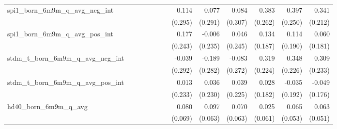 \begin{tabular}{lrrrrrrrrrrrr}
spi1\_born\_6m9m\_q\_avg\_neg\_int          &              &              &              &              &              &              &        0.114 &        0.077 &        0.084 &        0.383 &        0.397 &        0.341 \\ 
                                            &              &              &              &              &              &              &      (0.295) &      (0.291) &      (0.307) &      (0.262) &      (0.250) &      (0.212) \\ 
spi1\_born\_6m9m\_q\_avg\_pos\_int          &              &              &              &              &              &              &        0.177 &       -0.006 &        0.046 &        0.134 &        0.114 &        0.060 \\ 
                                            &              &              &              &              &              &              &      (0.243) &      (0.235) &      (0.245) &      (0.187) &      (0.190) &      (0.181) \\ 
stdm\_t\_born\_6m9m\_q\_avg\_neg\_int       &              &              &              &              &              &              &       -0.039 &       -0.189 &       -0.083 &        0.319 &        0.348 &        0.309 \\ 
                                            &              &              &              &              &              &              &      (0.292) &      (0.282) &      (0.272) &      (0.224) &      (0.226) &      (0.233) \\ 
stdm\_t\_born\_6m9m\_q\_avg\_pos\_int       &              &              &              &              &              &              &        0.013 &        0.036 &        0.039 &        0.028 &       -0.035 &       -0.049 \\ 
                                            &              &              &              &              &              &              &      (0.233) &      (0.230) &      (0.225) &      (0.182) &      (0.192) &      (0.176) \\ 
hd40\_born\_6m9m\_q\_avg                    &              &              &              &              &              &              &        0.080 &        0.097 &        0.070 &        0.025 &        0.065 &        0.063 \\ 
                                            &              &              &              &              &              &              &      (0.069) &      (0.063) &      (0.063) &      (0.061) &      (0.053) &      (0.051) \\ 

\end{tabular}
